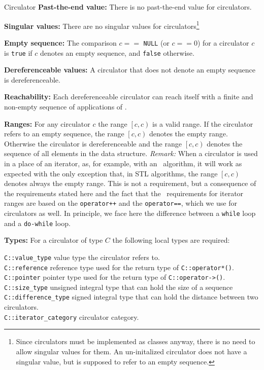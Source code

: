\begin{ccRefConcept}{Circulator}
{\bf Past-the-end value:} There is no past-the-end value for circulators.

{\bf Singular values:} There are no singular values for
 circulators\footnote{Since circulators must be implemented as classes
  anyway, there is no need to allow singular values for them. An
  un-initalized circulator does not have a singular value, but is
  supposed to refer to an empty sequence.}


{\bf Empty sequence:} The comparison $c ==$ {\tt NULL} (or $c == 0$)
for a circulator $c$ is {\tt true} if $c$ denotes an empty sequence,
and {\tt false} otherwise.

{\bf Dereferenceable values:} A circulator that does not denote an
empty sequence is dereferenceable.

{\bf Reachability:} Each dereferenceable circulator can reach itself
with a finite and non-empty sequence of applications of .

{\bf Ranges:} For any circulator $c$ the range $\left[c, c\right)$ is
a valid range. If the circulator refers to an empty sequence, the range
$\left[c, c\right)$ denotes the empty range. Otherwise the circulator
is dereferenceable and the range $\left[c, c\right)$ denotes the
sequence of all elements in the data structure. {\em Remark:} When a
circulator is used in a place of an iterator, as, for example, with an \stl\ 
algorithm, it will work as expected with the only exception that,
in STL algorithms,
the range $\left[c, c\right)$ denotes always the empty range.
This is
not a requirement, but a consequence of the requirements
stated here and the fact that the \stl\ requirements for iterator
ranges are based on the {\tt operator++} and the {\tt operator==},
which we use for circulators as well. In principle, we face here the 
difference between a {\tt while} loop and a {\tt do-while} loop.

{\bf Types:} For a circulator of type $C$ the following local types
are required: 

\begin{tabbing}
    {\tt C::value\_type}        \>  value type the circulator refers to.\\
    {\tt C::reference}          \>  reference type used for the return type
                                    of {\tt C::operator*()}.\\
    {\tt C::pointer}            \>  pointer type used for the return type of 
                                    {\tt  C::operator->()}.\\
    {\tt C::size\_type}         \>  unsigned integral type that can hold 
                                    the size of a sequence\\
    {\tt C::difference\_type}   \>  signed integral type that can hold 
                                    the distance between two circulators.\\
    {\tt C::iterator\_category} \>  circulator category.
\end{tabbing}


\end{ccRefConcept}
